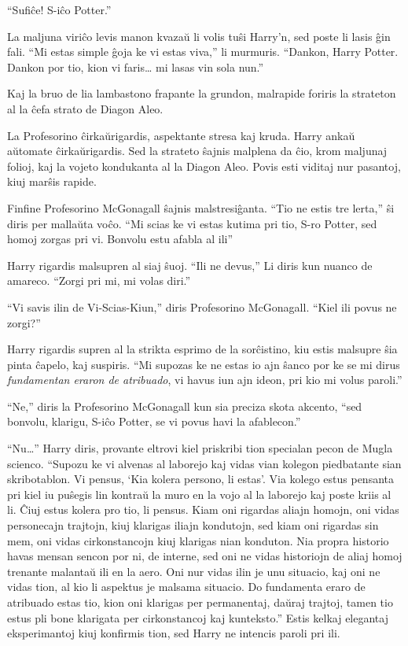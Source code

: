 ``Sufiĉe! S-iĉo Potter.''

La maljuna viriĉo levis manon kvazaŭ li volis tuŝi Harry'n, sed poste li
lasis ĝin fali. ``Mi estas simple ĝoja ke vi estas viva,'' li
murmuris. ``Dankon, Harry Potter. Dankon por tio, kion vi faris\ldots
mi lasas vin sola nun.''

Kaj la bruo de lia lambastono frapante la grundon, malrapide foriris
la strateton al la ĉefa strato de Diagon Aleo.

La Profesorino ĉirkaŭrigardis, aspektante stresa kaj kruda. Harry
ankaŭ aŭtomate ĉirkaŭrigardis. Sed la strateto ŝajnis malplena da ĉio,
krom maljunaj folioj, kaj la vojeto kondukanta al la Diagon Aleo.
Povis esti viditaj nur pasantoj, kiuj marŝis rapide.

Finfine Profesorino McGonagall ŝajnis malstresiĝanta. ``Tio ne estis
tre lerta,'' ŝi diris per mallaŭta voĉo. ``Mi scias ke vi estas kutima
pri tio, S-ro Potter, sed homoj zorgas pri vi. Bonvolu estu afabla al
ili''

Harry rigardis malsupren al siaj ŝuoj. ``Ili ne devus,'' Li diris kun
nuanco de amareco. ``Zorgi pri mi, mi volas diri.''

``Vi savis ilin de Vi-Scias-Kiun,'' diris Profesorino
McGonagall. ``Kiel ili povus ne zorgi?''

Harry rigardis supren al la strikta esprimo de la sorĉistino, kiu
estis malsupre ŝia pinta ĉapelo, kaj suspiris. ``Mi supozas ke ne
estas io ajn ŝanco por ke se mi dirus \emph{fundamentan eraron de
atribuado}, vi havus iun ajn ideon, pri kio mi volus paroli.''

``Ne,'' diris la Profesorino McGonagall kun sia preciza skota
akcento, ``sed bonvolu, klarigu, S-iĉo Potter, se vi povus havi la
afablecon.''

``Nu\ldots'' Harry diris, provante eltrovi kiel priskribi tion
specialan pecon de Mugla scienco. ``Supozu ke vi alvenas al laborejo
kaj vidas vian kolegon piedbatante sian skribotablon. Vi pensus, `Kia
kolera persono, li estas'. Via kolego estus pensanta pri kiel iu
puŝegis lin kontraŭ la muro en la vojo al la laborejo kaj poste kriis
al li. Ĉiuj estus kolera pro tio, li pensus. Kiam oni rigardas aliajn
homojn, oni vidas personecajn trajtojn, kiuj klarigas iliajn
kondutojn, sed kiam oni rigardas sin mem, oni vidas cirkonstancojn
kiuj klarigas nian konduton.  Nia propra historio havas mensan sencon
por ni, de interne, sed oni ne vidas historiojn de aliaj homoj
trenante malantaŭ ili en la aero. Oni nur vidas ilin je unu situacio,
kaj oni ne vidas tion, al kio li aspektus je malsama situacio. Do
fundamenta eraro de atribuado estas tio, kion oni klarigas per
permanentaj, daŭraj trajtoj, tamen tio estus pli bone klarigata per
cirkonstancoj kaj kunteksto.'' Estis kelkaj elegantaj eksperimantoj
kiuj konfirmis tion, sed Harry ne intencis paroli pri ili.


